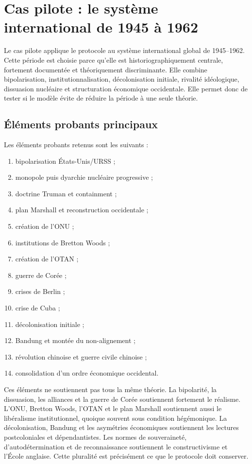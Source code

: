 \documentclass[11pt,a4paper]{article}
\begin{document}
\section{Cas pilote : le système international de 1945 à 1962}

Le cas pilote applique le protocole au système international global de 1945--1962. Cette période est choisie parce qu'elle est historiographiquement centrale, fortement documentée et théoriquement discriminante. Elle combine bipolarisation, institutionnalisation, décolonisation initiale, rivalité idéologique, dissuasion nucléaire et structuration économique occidentale. Elle permet donc de tester si le modèle évite de réduire la période à une seule théorie.

\subsection{Éléments probants principaux}

Les éléments probants retenus sont les suivants :

\begin{enumerate}
\item bipolarisation États-Unis/URSS ;
\item monopole puis dyarchie nucléaire progressive ;
\item doctrine Truman et containment ;
\item plan Marshall et reconstruction occidentale ;
\item création de l'ONU ;
\item institutions de Bretton Woods ;
\item création de l'OTAN ;
\item guerre de Corée ;
\item crises de Berlin ;
\item crise de Cuba ;
\item décolonisation initiale ;
\item Bandung et montée du non-alignement ;
\item révolution chinoise et guerre civile chinoise ;
\item consolidation d'un ordre économique occidental.
\end{enumerate}

Ces éléments ne soutiennent pas tous la même théorie. La bipolarité, la dissuasion, les alliances et la guerre de Corée soutiennent fortement le réalisme. L'ONU, Bretton Woods, l'OTAN et le plan Marshall soutiennent aussi le libéralisme institutionnel, quoique souvent sous condition hégémonique. La décolonisation, Bandung et les asymétries économiques soutiennent les lectures postcoloniales et dépendantistes. Les normes de souveraineté, d'autodétermination et de reconnaissance soutiennent le constructivisme et l'École anglaise. Cette pluralité est précisément ce que le protocole doit conserver.
\end{document}
